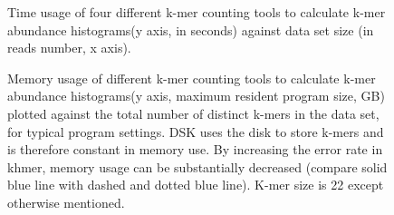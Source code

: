 \documentclass{article}
\begin{document}
\begin{figure}
\caption{Time usage of four different k-mer counting tools to calculate k-mer abundance histograms(y axis, in seconds) against data set size (in reads number, x axis).}
\label{cmp_time}
\end{figure}

\begin{figure}
\caption{Memory usage of different k-mer counting tools to calculate k-mer abundance histograms(y axis, maximum resident program size, GB) plotted against the total number of distinct k-mers in the data set, for typical program settings. DSK uses the disk to store k-mers and is therefore constant in memory use. By increasing the error rate in khmer, memory usage can be substantially decreased (compare solid blue line with dashed and dotted blue line). K-mer size is 22 except otherwise mentioned.}
\label{cmp_memory}
\end{figure}
\end{document}
